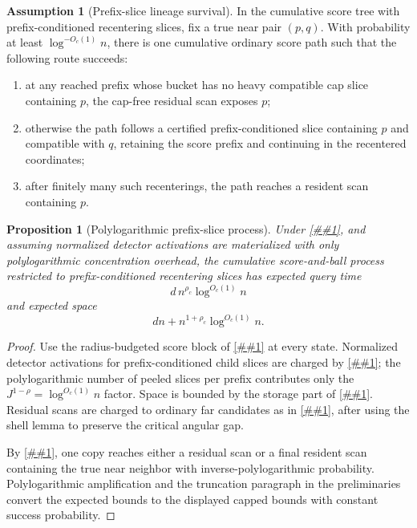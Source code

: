 \documentclass[10pt]{article}
\newcommand{\cref}[1]{\ref{##1}}
\newtheorem{proposition}[theorem]{Proposition}
\theoremstyle{definition}
\newtheorem{assumption}[theorem]{Assumption}
\begin{document}
\begin{assumption}[Prefix-slice lineage survival]\label{asm:prefix-slice-survival}
   In the cumulative score tree with prefix-conditioned recentering slices, fix a true near pair $(p,q)$. With probability at least $\log^{-O_c(1)}n$, there is one cumulative ordinary score path such that the following route succeeds:
   \begin{enumerate}
      \item at any reached prefix whose bucket has no heavy compatible cap slice containing $p$, the cap-free residual scan exposes $p$;
      \item otherwise the path follows a certified prefix-conditioned slice containing $p$ and compatible with $q$, retaining the score prefix and continuing in the recentered coordinates;
      \item after finitely many such recenterings, the path reaches a resident scan containing $p$.
   \end{enumerate}
\end{assumption}

\begin{proposition}[Polylogarithmic prefix-slice process]\label{prop:prefix-slice-process}
   Under \cref{asm:prefix-slice-survival}, and assuming normalized detector activations are materialized with only polylogarithmic concentration overhead, the cumulative score-and-ball process restricted to prefix-conditioned recentering slices has expected query time
   \[
      d\,n^{\rho_c}\log^{O_c(1)}n
   \]
   and expected space
   \[
      dn+n^{1+\rho_c}\log^{O_c(1)}n.
   \]
\end{proposition}

\begin{proof}
   Use the radius-budgeted score block of \cref{cor:radius-budgeted-block} at every state. Normalized detector activations for prefix-conditioned child slices are charged by \cref{lem:prefix-slice-accounting}; the polylogarithmic number of peeled slices per prefix contributes only the $J^{1-\rho}=\log^{O_c(1)}n$ factor. Space is bounded by the storage part of \cref{lem:prefix-slice-accounting}. Residual scans are charged to ordinary far candidates as in \cref{lem:slice-residual}, after using the shell lemma to preserve the critical angular gap.

   By \cref{asm:prefix-slice-survival}, one copy reaches either a residual scan or a final resident scan containing the true near neighbor with inverse-polylogarithmic probability. Polylogarithmic amplification and the truncation paragraph in the preliminaries convert the expected bounds to the displayed capped bounds with constant success probability.
\end{proof}
\end{document}
